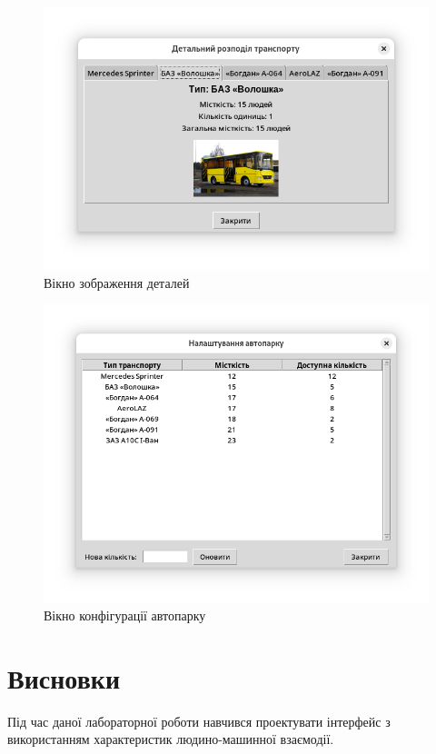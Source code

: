 \documentclass[14pt]{extreport}
\begin{document}
\begin{normalsize}
	\begin{figure}[H]
	  \centering
	  \includegraphics[scale=0.7, trim=0 50pt 0 50pt, clip]{2}
	  \caption{Вікно зображення деталей}
	\end{figure}
	
	\begin{figure}[H]
	  \centering
	  \includegraphics[scale=0.7, trim=0 50pt 0 50pt, clip]{3}
	  \caption{Вікно конфігурації автопарку}
	\end{figure}
	
	\section*{Висновки}
	
Під час даної лабораторної роботи навчився проектувати інтерфейс з
використанням характеристик людино-машинної взаємодії.
	
	    
\end{normalsize}
\end{document}
